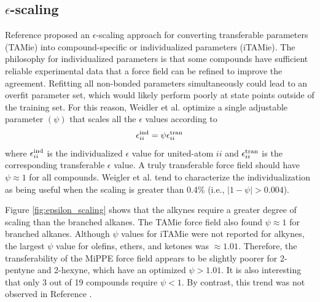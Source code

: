 \documentclass[journal=jced,manuscript=article]{achemso}
\begin{document}

\subsection{$\epsilon$-scaling}

Reference  proposed an $\epsilon$-scaling approach for converting transferable parameters (TAMie) into compound-specific or individualized parameters (iTAMie). The philosophy for individualized parameters is that some compounds have sufficient reliable experimental data that a force field can be refined to improve the agreement. Refitting all non-bonded parameters simultaneously could lead to an overfit parameter set, which would likely perform poorly at state points outside of the training set. For this reason, Weidler et al. optimize a single adjustable parameter $(\psi)$ that scales all the $\epsilon$ values according to
\begin{equation}
\epsilon_{ii}^{\rm ind} = \psi \epsilon_{ii}^{\rm tran}
\end{equation}
where $\epsilon_{ii}^{\rm ind}$ is the individualized $\epsilon$ value for united-atom $ii$ and $\epsilon_{ii}^{\rm tran}$ is the corresponding transferable $\epsilon$ value. A truly transferable force field should have $\psi \approx 1$ for all compounds. Weigler et al. tend to characterize the individualization as being useful when the scaling is greater than 0.4\% (i.e., $|1 - \psi| > 0.004$). 

Figure \ref{fig:epsilon_scaling} shows that the alkynes require a greater degree of scaling than the branched alkanes. The TAMie force field also found $\psi \approx 1$ for branched alkanes. Although $\psi$ values for iTAMie were not reported for alkynes, the largest $\psi$ value for olefins, ethers, and ketones was $\approx 1.01$. Therefore, the transferability of the MiPPE force field appears to be slightly poorer for 2-pentyne and 2-hexyne, which have an optimized $\psi > 1.01$. It is also interesting that only 3 out of 19 compounds require $\psi < 1$. By contrast, this trend was not observed in Reference . 

\end{document}
